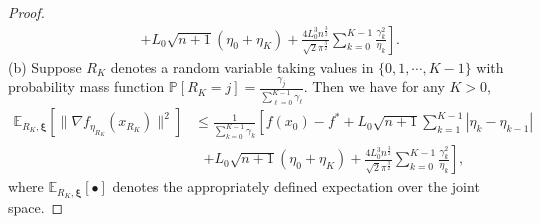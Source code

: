 \documentclass[11pt,reqno]{amsart}
\newcommand{\1}{{\bf 1}}
\newcommand{\2}{{\bf 2}}
\newcommand{\bxi}{\boldsymbol{\xi}}
\numberwithin{equation}{section}
\theoremstyle{remark}
\begin{document}
{\begin{proof}
\begin{align}
		&~~~\left. +L_0\sqrt{n+1}(\eta_0+\eta_K)+\frac{4L_0^3n^{\frac{3}{2}}}{\sqrt{2}\pi^{\frac{3}{2}}}\sum_{k=0}^{K-1}\frac{\gamma_k^2}{\eta_k} \right].
	\end{align}
	\noindent (b) Suppose $R_K$ denotes a random variable taking values in $\{0, 1, \cdots, K-1\}$ with probability mass function $\mathbb{P}[R_K = j] = \frac{\gamma_j}{\sum_{\ell=0}^{K-1} \gamma_\ell}$. Then we have for any $K > 0$, 
	\begin{align*} 
		\mathbb{E}_{R_K, \bxi} \left[ \| \nabla f_{\eta_{R_K}} (x_{R_K}) \|^2 \right] &\leq \frac{1}{\sum_{k=0}^{K-1}\gamma_k} \left[f(x_0)-f^*+L_0\sqrt{n+1}\sum_{k=1}^{K-1}|\eta_k-\eta_{k-1}|\right.\\
		&~~~\left.+L_0\sqrt{n+1}(\eta_0+\eta_K)  +\frac{4L_0^3n^{\frac{3}{2}}}{\sqrt{2}\pi^{\frac{3}{2}}}\sum_{k=0}^{K-1}\frac{\gamma_k^2}{\eta_k} \right],
	\end{align*}
	where $\mathbb{E}_{R_K,\bxi}[\bullet]$ denotes the appropriately defined expectation over the joint space.
	
	\end{proof}
	\medskip
	
}
\end{document}
